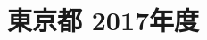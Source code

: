 \documentclass[../../hsm_tok_q.tex]{subfiles}
\begin{document}
    \section{東京都 2017年度}
    \subsection{　}
    
    \newpage
    \subsection{　}
    
    \newpage
    \subsection{　}
    
    \newpage
    \subsection{　}
    
    \newpage
    \subsection{　}
    
\end{document}
